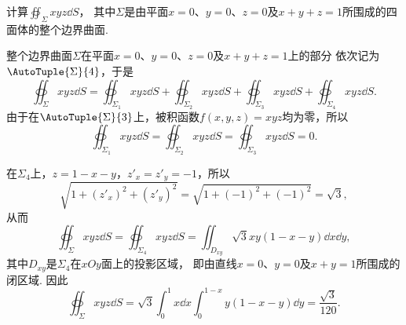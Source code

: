 \begin{example}
计算\(\oiint_\Sigma xyz \dd{S}\)，
其中\(\Sigma\)是由平面\(x=0\)、\(y=0\)、\(z=0\)及\(x+y+z=1\)所围成的四面体的整个边界曲面.
\begin{solution}
整个边界曲面\(\Sigma\)在平面\(x=0\)、\(y=0\)、\(z=0\)及\(x+y+z=1\)上的部分
依次记为\(\AutoTuple{\Sigma}{4}\)，于是\[
	\oiint_\Sigma xyz \dd{S}
	= \oiint_{\Sigma_1} xyz \dd{S}
	+ \oiint_{\Sigma_2} xyz \dd{S}
	+ \oiint_{\Sigma_3} xyz \dd{S}
	+ \oiint_{\Sigma_4} xyz \dd{S}.
\]
由于在\(\AutoTuple{\Sigma}{3}\)上，被积函数\(f(x,y,z)=xyz\)均为零，所以\[
	\oiint_{\Sigma_1} xyz \dd{S}
	= \oiint_{\Sigma_2} xyz \dd{S}
	= \oiint_{\Sigma_3} xyz \dd{S}
	= 0.
\]

在\(\Sigma_4\)上，\(z=1-x-y\)，\(z'_x = z'_y = -1\)，所以\[
	\sqrt{1+(z'_x)^2+(z'_y)^2}
	= \sqrt{1+(-1)^2+(-1)^2}
	= \sqrt{3},
\]
从而\[
	\oiint_\Sigma xyz \dd{S}
	= \oiint_{\Sigma_4} xyz \dd{S}
	= \iint_{D_{xy}} \sqrt{3} xy (1-x-y) \dd{x} \dd{y},
\]
其中\(D_{xy}\)是\(\Sigma_4\)在\(xOy\)面上的投影区域，
即由直线\(x=0\)、\(y=0\)及\(x+y=1\)所围成的闭区域.
因此\[
	\oiint_\Sigma xyz \dd{S}
	= \sqrt{3} \int_0^1 x \dd{x} \int_0^{1-x} y (1-x-y) \dd{y}
	= \frac{\sqrt{3}}{120}.
\]
\end{solution}
\end{example}

